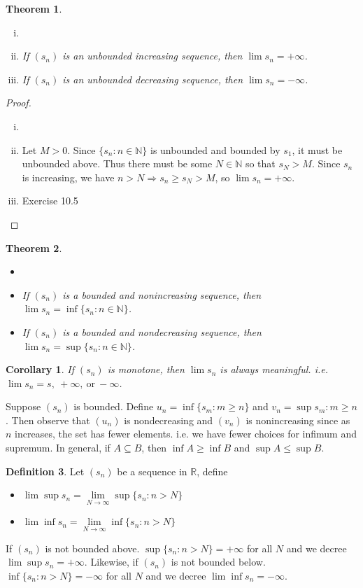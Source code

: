 \documentclass[12pt, lettersize]{book}
\theoremstyle{plain}
\newtheorem{thm}{Theorem}[section]
\newtheorem{cor}{Corollary}[thm]
\theoremstyle{definition}
\newtheorem{dfn}[thm]{Definition}
\theoremstyle{remark}
\newcommand{\N}{\mathbb{N}}
\begin{document}
		\begin{thm}\label{def:unbounded monotone seq}
		\begin{enumerate}[(i)]
			\item[]
			\item If $(s_n)$ is an unbounded increasing sequence, then $\lim s_n=+\infty$.
			\item If $(s_n)$ is an unbounded decreasing sequence, then $\lim s_n=-\infty$.
		\end{enumerate}
		\end{thm}
		\begin{proof}
		\begin{enumerate}[(i)]
			\item[]
			\item Let $M>0$. Since $\{s_n: n\in\mathbb{N}\}$ is unbounded and bounded by $s_1$, it must be unbounded above.
			Thus there must be some $N\in\mathbb{N}$ so that $s_N>M$. Since $s_n$ is increasing, we have $n>N\Rightarrow s_n\geq s_N>M$, so $\lim s_n=+\infty$. 
			\item Exercise 10.5
		\end{enumerate}
		\end{proof}
		\begin{thm}
		\begin{itemize}
			\item[]
			\item If $(s_n)$ is a bounded and nonincreasing sequence, then $\lim s_n=\inf\{s_n: n\in\N\}$.
			\item If $(s_n)$ is a bounded and nondecreasing sequence, then $\lim s_n=\sup\{s_n: n\in\N\}$.
		\end{itemize}
		\end{thm}
		\begin{cor}
		If $(s_n)$ is monotone, then $\lim s_n$ is always meaningful. i.e. $\lim s_n=s,\ +\infty,\ \text{or}\ -\infty$.
		\end{cor}\bigskip
	
		Suppose $(s_n)$ is bounded. Define $u_n=\inf\{s_m: m\geq n\}$ and $v_n=\sup{s_m: m\geq n}$. Then observe that $(u_n)$ is nondecreasing and $(v_n)$ is nonincreasing since as $n$ increases, the set has fewer elements. i.e. we have fewer choices for infimum and supremum. In general, if $A\subseteq B$, then $\inf A\geq \inf B$ and $\sup A\leq \sup B$.
		
		\begin{dfn}
		Let $(s_n)$ be a sequence in $\mathbb{R}$, define
		\begin{itemize}
			\item $\lim\sup s_n=\lim\limits_{N\rightarrow\infty}\sup\{s_n: n>N\}$
			\item $\lim\inf s_n=\lim\limits_{N\rightarrow\infty}\inf\{s_n: n>N\}$
		\end{itemize}
		\end{dfn}
		If $(s_n)$ is not bounded above. $\sup\{s_n: n>N\}=+\infty$ for all $N$ and we decree $\lim\sup s_n=+\infty$.
		Likewise, if $(s_n)$ is not bounded below. $\inf\{s_n: n>N\}=-\infty$ for all $N$ and we decree $\lim\inf s_n=-\infty$.
		
\end{document}

